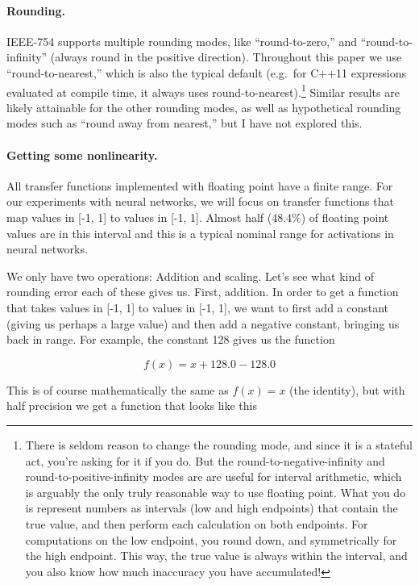 \documentclass[twocolumn]{article}
\begin{document}
\paragraph{Rounding.}
IEEE-754 supports multiple rounding modes, like ``round-to-zero,'' and
``round-to-infinity'' (always round in the positive direction).
Throughout this paper we use ``round-to-nearest,'' which is also the
typical default (e.g.~for C++11 expressions evaluated at compile time,
it always uses round-to-nearest).\footnote{There is seldom reason to
  change the rounding mode, and since it is a stateful act, you're
  asking for it if you do. But the round-to-negative-infinity and
  round-to-positive-infinity modes are are useful for interval
  arithmetic, which is arguably the only truly reasonable way to use
  floating point. What you do is represent numbers as intervals (low
  and high endpoints) that contain the true value, and then perform
  each calculation on both endpoints. For computations on the low
  endpoint, you round down, and symmetrically for the high endpoint.
  This way, the true value is always within the interval, and you also
  know how much inaccuracy you have accumulated!} Similar results are
likely attainable for the other rounding modes, as well as
hypothetical rounding modes such as ``round away from nearest,'' but I
have not explored this.

\paragraph{Getting some nonlinearity.}
All transfer functions implemented with floating point have a finite
range. For our experiments with neural networks, we will focus on
transfer functions that map values in [-1, 1] to values in [-1, 1].
Almost half (48.4\%) of floating point values are in this interval and this
is a typical nominal range for activations in neural networks.

We only have two operations: Addition and scaling. Let's see what kind
of rounding error each of these gives us. First, addition. In order to
get a function that takes values in [-1, 1] to values in [-1, 1], we
want to first add a constant (giving us perhaps a large value) and
then add a negative constant, bringing us back in range. For example,
the constant 128 gives us the function

$$f(x) = x + 128.0 - 128.0$$

This is of course mathematically the same as $f(x) = x$ (the
identity), but with half precision we get a function that looks like
this
\end{document}
